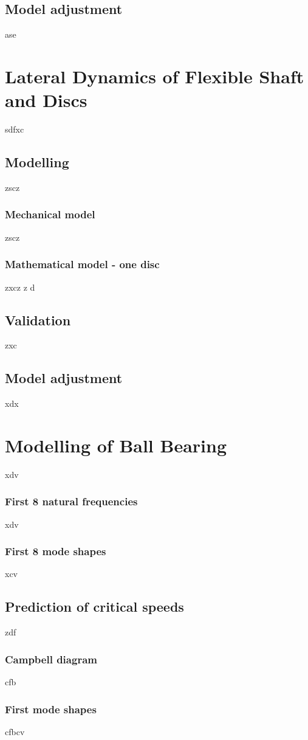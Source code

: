 \subsection{Model adjustment}
ase
\section{Lateral Dynamics of Flexible Shaft and Discs}
sdfxc
\subsection{Modelling}
zscz
\subsubsection{Mechanical model}
zscz
\subsubsection{Mathematical model - one disc}
zxcz
z d
\subsection{Validation}
zxc
\subsection{Model adjustment}
xdx
\section{Modelling of Ball Bearing}
xdv
\subsubsection{First 8 natural frequencies}
xdv
\subsubsection{First 8 mode shapes}
xcv
\subsection{Prediction of critical speeds}
zdf
\subsubsection{Campbell diagram}
cfb
\subsubsection{First mode shapes}
cfbcv
